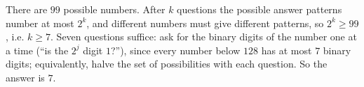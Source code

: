 There are $99$ possible numbers. After $k$ questions the possible answer patterns number at most $2^k$, and different numbers must give different patterns, so $2^k\ge99$, i.e. $k\ge7$. Seven questions suffice: ask for the binary digits of the number one at a time (``is the $2^j$ digit $1$?''), since every number below $128$ has at most $7$ binary digits; equivalently, halve the set of possibilities with each question. So the answer is $\boxed{7}$.

